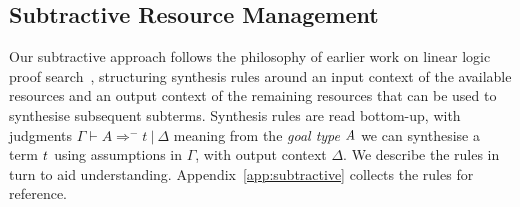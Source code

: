
\subsection{Subtractive Resource Management}
  Our subtractive approach follows the philosophy of earlier work on
  linear logic proof search~\cite{HODAS1994327,CERVESATO2000133},
  structuring synthesis rules around an input context of the available
  resources and an output context of the remaining resources that
  can be used to synthesise subsequent subterms. Synthesis rules
  are read bottom-up, with judgments $\Gamma \vdash A \Rightarrow^{-} t\ |\ \Delta$
  meaning from the \emph{goal type} $\mathit{A}$ we can synthesise a term $\mathit{t}$ using
  assumptions in $\Gamma$, with output context $\Delta$. We describe
  the rules in turn to aid understanding. Appendix~\ref{app:subtractive} collects the
  rules for reference.


